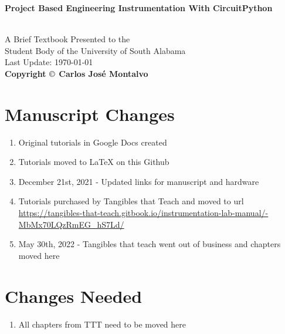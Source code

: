 \documentclass{article}
\begin{document}
\begin{center}
\begin{LARGE}{\bf Project Based Engineering Instrumentation With CircuitPython}\end{LARGE}\\
\large
\vspace{22 mm}
   A Brief Textbook Presented to the \\ 
   Student Body of the University of South Alabama \\
\vspace{22 mm}
\vspace{22 mm}
\vspace{22 mm}
       Last Update: \today\\
{\bf Copyright $\copyright$ Carlos Jos\'{e} Montalvo}
\end{center}

\linespread{1}

\newpage

\section*{Manuscript Changes}

\begin{enumerate}[itemsep=-5pt]
\item Original tutorials in Google Docs created
\item Tutorials moved to LaTeX on this Github
\item December 21st, 2021 - Updated links for manuscript and hardware
\item Tutorials purchased by Tangibles that Teach and moved to url \url{https://tangibles-that-teach.gitbook.io/instrumentation-lab-manual/-MbMx70LQzRmEG_hS7Ld/}
\item May 30th, 2022 - Tangibles that teach went out of business and
  chapters moved here
\end{enumerate}

\section*{Changes Needed}

\begin{enumerate}[itemsep=-5pt]
  \item All chapters from TTT need to be moved here
\end{enumerate}

\newpage












\end{document}
